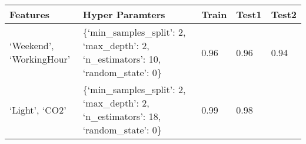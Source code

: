 \documentclass[11pt]{article}
\begin{document}
    \begin{longtable}[]{@{}lllll@{}}
\toprule
\begin{minipage}[b]{0.25\columnwidth}\raggedright
Features\strut
\end{minipage} & \begin{minipage}[b]{0.47\columnwidth}\raggedright
Hyper Paramters\strut
\end{minipage} & \begin{minipage}[b]{0.05\columnwidth}\raggedright
Train\strut
\end{minipage} & \begin{minipage}[b]{0.05\columnwidth}\raggedright
Test1\strut
\end{minipage} & \begin{minipage}[b]{0.05\columnwidth}\raggedright
Test2\strut
\end{minipage}\tabularnewline
\midrule
\endhead
\begin{minipage}[t]{0.25\columnwidth}\raggedright
`Weekend', `WorkingHour'\strut
\end{minipage} & \begin{minipage}[t]{0.47\columnwidth}\raggedright
\{`min\_samples\_split': 2, `max\_depth': 2, `n\_estimators': 10,
`random\_state': 0\}\strut
\end{minipage} & \begin{minipage}[t]{0.05\columnwidth}\raggedright
0.96\strut
\end{minipage} & \begin{minipage}[t]{0.05\columnwidth}\raggedright
0.96\strut
\end{minipage} & \begin{minipage}[t]{0.05\columnwidth}\raggedright
0.94\strut
\end{minipage}\tabularnewline
\begin{minipage}[t]{0.25\columnwidth}\raggedright
`Light', `CO2'\strut
\end{minipage} & \begin{minipage}[t]{0.47\columnwidth}\raggedright
\{`min\_samples\_split': 2, `max\_depth': 2, `n\_estimators': 18,
`random\_state': 0\}\strut
\end{minipage} & \begin{minipage}[t]{0.05\columnwidth}\raggedright
0.99\strut
\end{minipage} & \begin{minipage}[t]{0.05\columnwidth}\raggedright
0.98\strut
\end{minipage} & \begin{minipage}[t]{0.05\columnwidth}\raggedright

\end{minipage}
\end{longtable}
\end{document}

